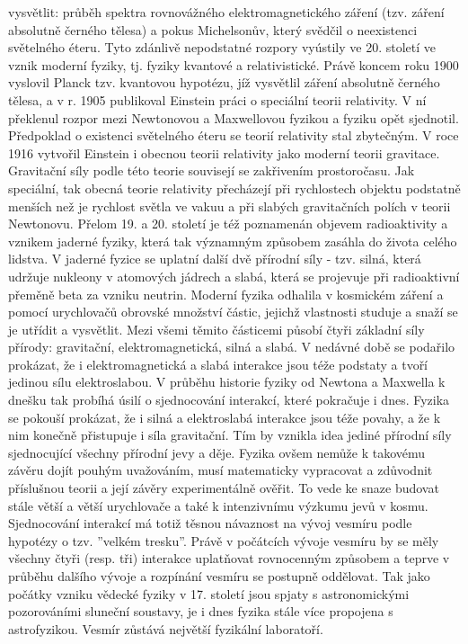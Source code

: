     vysvětlit: průběh spektra rovnovážného elektromagnetického záření (tzv. záření absolutně černého 
    tělesa) a pokus Michelsonův, který svědčil o neexistenci světelného éteru. Tyto zdánlivě nepodstatné 
    rozpory vyústily ve 20. století ve vznik moderní fyziky, tj. fyziky kvantové a relativistické. Právě 
    koncem roku 1900 vyslovil Planck tzv. kvantovou hypotézu, jíž vysvětlil záření absolutně černého 
    tělesa, a v r. 1905 publikoval Einstein práci o speciální teorii relativity. V ní překlenul rozpor 
    mezi Newtonovou a Maxwellovou fyzikou a fyziku opět sjednotil. Předpoklad o existenci světelného 
    éteru se teorií relativity stal zbytečným. V roce 1916 vytvořil Einstein i obecnou teorii
    relativity jako moderní teorii gravitace. Gravitační síly podle této teorie souvisejí se zakřivením 
    prostoročasu. Jak speciální, tak obecná teorie relativity přecházejí při rychlostech objektu 
    podstatně menších než je rychlost světla ve vakuu a při slabých gravitačních polích v teorii 
    Newtonovu. Přelom 19. a 20. století je též poznamenán objevem radioaktivity a vznikem jaderné fyziky, 
    která tak významným způsobem zasáhla do života celého lidstva. V jaderné fyzice se uplatní další dvě 
    přírodní síly - tzv. silná, která udržuje nukleony v atomových jádrech a slabá, která se projevuje 
    při radioaktivní přeměně beta za vzniku neutrin. Moderní fyzika odhalila v kosmickém záření a pomocí 
    urychlovačů obrovské množství částic, jejichž vlastnosti studuje a snaží se je utřídit a vysvětlit. 
    Mezi všemi těmito částicemi působí čtyři základní síly přírody: gravitační, elektromagnetická, silná 
    a slabá. V nedávné době se podařilo prokázat, že i elektromagnetická a slabá interakce jsou téže 
    podstaty a tvoří jedinou sílu elektroslabou. V průběhu historie fyziky od Newtona a Maxwella k dnešku 
    tak probíhá úsilí o sjednocování interakcí, které pokračuje i dnes. Fyzika se pokouší prokázat, že i 
    silná a elektroslabá interakce jsou téže povahy, a že k nim konečně přistupuje i síla gravitační. Tím 
    by vznikla idea jediné přírodní síly sjednocující všechny přírodní jevy a děje. Fyzika ovšem nemůže k 
    takovému závěru dojít pouhým uvažováním, musí matematicky vypracovat a zdůvodnit příslušnou teorii a 
    její závěry experimentálně ověřit. To vede ke snaze budovat stále větší a větší urychlovače a také k 
    intenzivnímu výzkumu jevů v kosmu. Sjednocování interakcí má totiž těsnou návaznost na vývoj vesmíru 
    podle hypotézy o tzv. ”velkém tresku”. Právě v počátcích vývoje vesmíru by se měly všechny čtyři 
    (resp. tři) interakce uplatňovat rovnocenným způsobem a teprve v průběhu dalšího vývoje a rozpínání 
    vesmíru se postupně oddělovat. Tak jako počátky vzniku vědecké fyziky v 17. století jsou spjaty s 
    astronomickými pozorováními sluneční soustavy, je i dnes fyzika stále více propojena s astrofyzikou. 
    Vesmír zůstává největší fyzikální laboratoří.
\printbibliography[heading=subbibliography]
